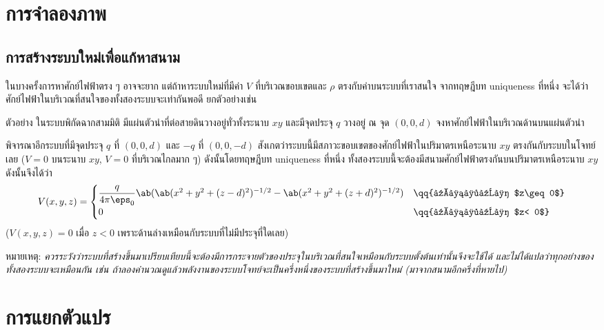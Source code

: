 \section{การจำลองภาพ}
\subsection{การสร้างระบบใหม่เพื่อแก้หาสนาม}
ในบางครั้งการหาศักย์ไฟฟ้าตรง ๆ อาจจะยาก แต่ถ้าหาระบบใหม่ที่มีค่า $V$ ที่บริเวณขอบเขตและ $\rho$ ตรงกับค่าบนระบบที่เราสนใจ จากทฤษฎีบท uniqueness ที่หนึ่ง จะได้ว่าศักย์ไฟฟ้าในบริเวณที่สนใจของทั้งสองระบบจะเท่ากันพอดี ยกตัวอย่างเช่น

\begin{corbox}{ตัวอย่าง}
    ในระบบพิกัดฉากสามมิติ มีแผ่นตัวนำที่ต่อสายดินวางอยู่ทั่วทั้งระนาบ $xy$ และมีจุดประจุ $q$ วางอยู่ ณ จุด $(0,0,d)$ จงหาศักย์ไฟฟ้าในบริเวณด้านบนแผ่นตัวนำ
\end{corbox}
\begin{soln}
    พิจารณาอีกระบบที่มีจุดประจุ $q$ ที่ $(0,0,d)$ และ $-q$ ที่ $(0,0,-d)$ สังเกตว่าระบบนี้มีสภาวะขอบเขตของศักย์ไฟฟ้าในปริมาตรเหนือระนาบ $xy$ ตรงกันกับระบบในโจทย์เลย ($V=0$ บนระนาบ $xy$, $V=0$ ที่บริเวณไกลมาก ๆ) ดังนั้นโดยทฤษฎีบท uniqueness ที่หนึ่ง ทั้งสองระบบนี้จะต้องมีสนามศักย์ไฟฟ้าตรงกันบนปริมาตรเหนือระนาบ $xy$ ดังนั้นจึงได้ว่า
    \[
    V(x,y,z)=\begin{cases}
        \dfrac{q}{4\pi\eps_0}\ab(\ab(x^2+y^2+(z-d)^2)^{-1/2}-\ab(x^2+y^2+(z+d)^2)^{-1/2})&\qq{เมื่อ $z\geq0$}\\
        0&\qq{เมื่อ $z< 0$}
    \end{cases}
    \]
    ($V(x,y,z)=0$ เมื่อ $z<0$ เพราะด้านล่างเหมือนกับระบบที่ไม่มีประจุที่ใดเลย)
\end{soln}
หมายเหตุ: \emph{ควรระวังว่าระบบที่สร้างขึ้นมาเปรียบเทียบนี้จะต้องมีการกระจายตัวของประจุในบริเวณที่สนใจเหมือนกับระบบตั้งต้นเท่านั้นจึงจะใช้ได้ และไม่ได้แปลว่าทุกอย่างของทั้งสองระบบจะเหมือนกัน เช่น ถ้าลองคำนวณดูแล้วพลังงานของระบบโจทย์จะเป็นครึ่งหนึ่งของระบบที่สร้างขึ้นมาใหม่ (มาจากสนามอีกครึ่งที่หายไป)}
\section{การแยกตัวแปร}

